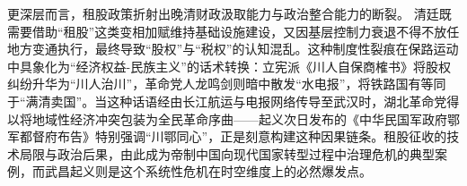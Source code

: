 更深层而言，租股政策折射出晚清财政汲取能力与政治整合能力的断裂。
清廷既需要借助“租股”这类变相加赋维持基础设施建设，又因基层控制力衰退不得不放任地方变通执行，最终导致“股权”与“税权”的认知混乱。这种制度性裂痕在保路运动中具象化为“经济权益-民族主义”的话术转换：立宪派《川人自保商榷书》将股权纠纷升华为“川人治川”，革命党人龙鸣剑则暗中散发“水电报”，将铁路国有等同于“满清卖国”。当这种话语经由长江航运与电报网络传导至武汉时，湖北革命党得以将地域性经济冲突包装为全民革命序曲——起义次日发布的《中华民国军政府鄂军都督府布告》特别强调“川鄂同心”，正是刻意构建这种因果链条。租股征收的技术局限与政治后果，由此成为帝制中国向现代国家转型过程中治理危机的典型案例，而武昌起义则是这个系统性危机在时空维度上的必然爆发点。
